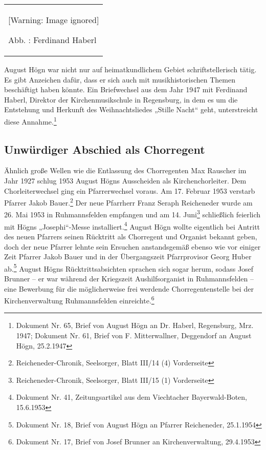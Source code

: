 \documentclass[a4paper]{article}
\newcounter{Abb}
\renewcommand\theAbb{\arabic{Abb}}
\begin{document}
\begin{flushleft}
\tablefirsthead{}
\tablehead{}
\tabletail{}
\tablelasttail{}
\begin{supertabular}{m{3.7879999cm}}

\begin{center}
 [Warning: Image ignored] %

\end{center}
Abb. \stepcounter{Abb}{\theAbb}: Ferdinand Haberl\\
\end{supertabular}
\end{flushleft}
August Högn war nicht nur auf heimatkundlichem Gebiet schriftstellerisch
tätig. Es gibt Anzeichen dafür, dass er sich auch mit musikhistorischen
Themen beschäftigt haben könnte. Ein Briefwechsel aus dem Jahr 1947 mit
Ferdinand Haberl, Direktor der Kirchenmusikschule in Regensburg, in dem
es um die Entstehung und Herkunft des Weihnachtsliedes „Stille Nacht“
geht, unterstreicht diese Annahme.\footnote{ Dokument Nr. 65, Brief von
August Högn an Dr. Haberl, Regensburg, Mrz. 1947; Dokument Nr. 61,
Brief von F. Mitterwallner, Deggendorf an August Högn, 25.2.1947}

\subsection{Unwürdiger Abschied als Chorregent}
\hypertarget{RefHeadingToc100333737}{}Ähnlich große Wellen wie die
Entlassung des Chorregenten Max Rauscher im Jahr 1927 schlug 1953
August Högns Ausscheiden als Kirchenchorleiter. Dem Chorleiterwechsel
ging ein Pfarrerwechsel voraus. Am 17. Februar 1953 verstarb Pfarrer
Jakob Bauer.\footnote{ Reicheneder-Chronik, Seelsorger, Blatt III/14
(4) Vorderseite} Der neue Pfarrherr Franz Seraph Reicheneder wurde am
26. Mai 1953 in Ruhmannsfelden empfangen und am 14. Juni\footnote{
Reicheneder-Chronik, Seelsorger, Blatt III/15 (1) Vorderseite}
schließlich feierlich mit Högns „Josephi“-Messe installiert.\footnote{
Dokument Nr. 41, Zeitungsartikel aus dem Viechtacher Bayerwald-Boten,
15.6.1953} August Högn wollte eigentlich bei Antritt des neuen Pfarrers
seinen Rücktritt als Chorregent und Organist bekannt geben, doch der
neue Pfarrer lehnte sein Ersuchen anstandsgemäß ebenso wie vor einiger
Zeit Pfarrer Jakob Bauer und in der Übergangszeit Pfarrprovisor Georg
Huber ab.\footnote{ Dokument Nr. 18, Brief von August Högn an Pfarrer
Reicheneder, 25.1.1954} August Högns Rücktrittsabsichten sprachen sich
sogar herum, sodass Josef Brunner – er war während der Kriegszeit
Aushilfsorganist in Ruhmannsfelden – eine Bewerbung für die
möglicherweise frei werdende Chorregentenstelle bei der
Kirchenverwaltung Ruhmannsfelden einreichte.\footnote{ Dokument Nr. 17,
Brief von Josef Brunner an Kirchenverwaltung, 29.4.1953}
\end{document}
